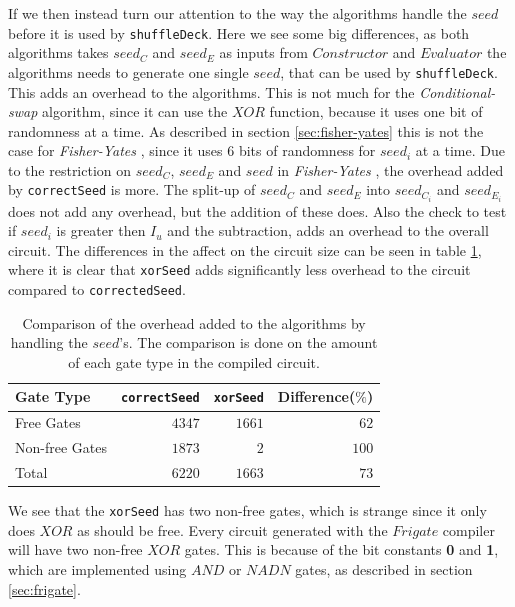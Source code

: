 \documentclass[twoside,11pt,openright]{report}
\newcommand{\FY}{\textit{Fisher-Yates} }
\newcommand{\CS}{\textit{Conditional-swap} }
\begin{document}
If we then instead turn our attention to the way the algorithms handle the $seed$ before it is used by \verb|shuffleDeck|. Here we see some big differences, as both algorithms takes $seed_C$ and $seed_E$ as inputs from $Constructor$ and $Evaluator$ the algorithms needs to generate one single $seed$, that can be used by \verb|shuffleDeck|. This adds an overhead to the algorithms. This is not much for the \CS algorithm, since it can use the $XOR$ function, because it uses one bit of randomness at a time. As described in section \ref{sec:fisher-yates} this is not the case for \FY, since it uses $6$ bits of randomness for $seed_i$ at a time. Due to the restriction on $seed_C$, $seed_E$ and $seed$ in \FY, the overhead added by \verb|correctSeed| is more. The split-up of $seed_C$ and $seed_E$ into $seed_{C_i}$ and $seed_{E_i}$ does not add any overhead, but the addition of these does. Also the check to test if $seed_i$ is greater then $I_u$ and the subtraction, adds an overhead to the overall circuit. The differences in the affect on the circuit size can be seen in table \ref{table:alg_preprocess_overhead}, where it is clear that \verb|xorSeed| adds significantly less overhead to the circuit compared to \verb|correctedSeed|. 

\begin{table}[t]
\centering
\begin{tabular}{l || r r r}
Gate Type      & \verb|correctSeed| & \verb|xorSeed| & Difference($\%$)    \\
\hline
Free Gates     & $4347$             & $1661$         &  $62$ \\
Non-free Gates & $1873$             &    $2$         & $100$ \\
\hline
Total          & $6220$             & $1663$         &  $73$
\end{tabular}
\caption{Comparison of the overhead added to the algorithms by handling the $seed$'s. The comparison is done on the amount of each gate type in the compiled circuit.}
\label{table:alg_preprocess_overhead}
\end{table}

We see that the \verb|xorSeed| has two non-free gates, which is strange since it only does $XOR$ as should be free. Every circuit generated with the $Frigate$ compiler will have two non-free $XOR$ gates. This is because of the bit constants \textbf{0} and \textbf{1}, which are implemented using $AND$ or $NADN$ gates, as described in section \ref{sec:frigate}. 

\bigskip
\end{document}
